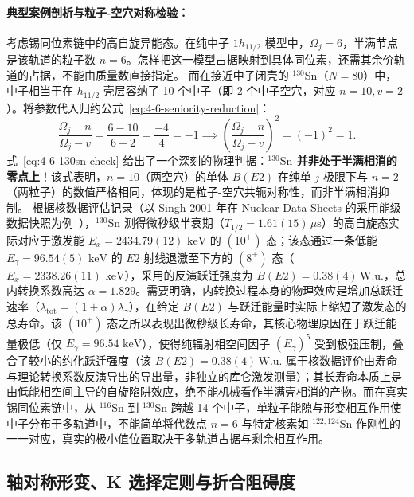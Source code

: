 \paragraph{典型案例剖析与粒子-空穴对称检验：}
考虑锡同位素链中的高自旋异能态。在纯中子 $1h_{11/2}$ 模型中，$\Omega_j=6$，半满节点是该轨道的粒子数 $n=6$。怎样把这一模型占据映射到具体同位素，还需其余价轨道的占据，不能由质量数直接指定。
而在接近中子闭壳的 $^{130}\mathrm{Sn}$（$N=80$）中，中子相当于在 $h_{11/2}$ 壳层容纳了 10 个中子（即 2 个中子空穴，对应 $n=10, v=2$）。将参数代入归约公式~\eqref{eq:4-6-seniority-reduction}：
\begin{equation}\label{eq:4-6-130sn-check}
\frac{\Omega_j - n}{\Omega_j - v} = \frac{6 - 10}{6 - 2} = \frac{-4}{4} = -1 \implies \left( \frac{\Omega_j - n}{\Omega_j - v} \right)^2 = (-1)^2 = 1.
\end{equation}
式~\eqref{eq:4-6-130sn-check} 给出了一个深刻的物理判据：\textbf{$^{130}\mathrm{Sn}$ 并非处于半满相消的零点上}！该式表明，$n=10$（两空穴）的单体 $B(E2)$ 在纯单 $j$ 极限下与 $n=2$（两粒子）的数值严格相同，体现的是粒子-空穴共轭对称性，而非半满相消抑制。
根据核数据评估记录（以 Singh 2001 年在 Nuclear Data Sheets 的采用能级数据快照为例~\cite{singh-2001-nds-130sn-adopted}），$^{130}\mathrm{Sn}$ 测得微秒级半衰期（$T_{1/2} = 1.61(15)\,\mu\mathrm{s}$）的高自旋态实际对应于激发能 $E_x = 2434.79(12)\text{ keV}$ 的 $(10^+)$ 态；该态通过一条低能 $E_\gamma = 96.54(5)\text{ keV}$ 的 $E2$ 射线退激至下方的 $(8^+)$ 态（$E_x = 2338.26(11)\text{ keV}$），采用的反演跃迁强度为 $B(E2) = 0.38(4)\,\text{W.u.}$，总内转换系数高达 $\alpha = 1.829$。需要明确，内转换过程本身的物理效应是增加总跃迁速率（$\lambda_{\mathrm{tot}} = (1+\alpha)\lambda_\gamma$），在给定 $B(E2)$ 与跃迁能量时实际上缩短了激发态的总寿命。该 $(10^+)$ 态之所以表现出微秒级长寿命，其核心物理原因在于跃迁能量极低（仅 $E_\gamma = 96.54\text{ keV}$），使得纯辐射相空间因子 $(E_\gamma)^5$ 受到极强压制，叠合了较小的约化跃迁强度（该 $B(E2) = 0.38(4)\,\text{W.u.}$ 属于核数据评价由寿命与理论转换系数反演导出的导出量，非独立的库仑激发测量）；其长寿命本质上是由低能相空间主导的自旋陷阱效应，绝不能机械看作半满壳相消的产物。而在真实锡同位素链中，从 $^{116}\mathrm{Sn}$ 到 $^{130}\mathrm{Sn}$ 跨越 14 个中子，单粒子能隙与形变相互作用使中子分布于多轨道中，不能简单将代数点 $n=6$ 与特定核素如 $^{122,124}\mathrm{Sn}$ 作刚性的一一对应，真实的极小值位置取决于多轨道占据与剩余相互作用。

\subsection{轴对称形变、K 选择定则与折合阻碍度}\label{sec:4-6-2}

